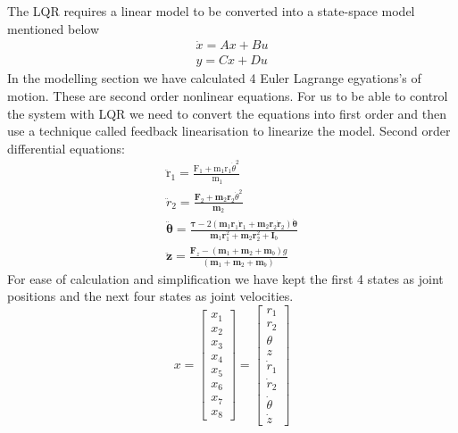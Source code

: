 \documentclass{UoNMCHA}
\numberwithin{equation}{section}
\begin{document}
The LQR requires a linear model to be converted into a state-space model mentioned below
$$
\begin{array}{l}
\dot{x}=A x+B u \\
y=C x+D u
\end{array}
$$
In the modelling section we have calculated 4 Euler Lagrange egyations's of motion. These are second
order nonlinear equations. For us to be able to control the system with LQR we need to convert the
equations into first order and then use a technique called feedback linearisation to linearize the model.
Second order differential equations:
$$
\begin{array}{c}
\ddot{\mathrm{r}}_{1}=\frac{\mathrm{F}_{1}+\mathrm{m}_{1} \mathrm{r}_{1} \dot{\theta}^{2}}{\mathrm{~m}_{1}} \\
\ddot{r}_{2}=\frac{\boldsymbol{F}_{2}+\boldsymbol{m}_{2} \boldsymbol{r}_{2} \dot{\theta}^{2}}{\boldsymbol{m}_{2}} \\
\ddot{\boldsymbol{\theta}}=\frac{\boldsymbol{\tau}-2\left(\boldsymbol{m}_{1} \boldsymbol{r}_{1} \dot{\boldsymbol{r}}_{1}+\boldsymbol{m}_{2} \boldsymbol{r}_{2} \dot{\boldsymbol{r}}_{2}\right) \dot{\boldsymbol{\theta}}}{\boldsymbol{m}_{1} \boldsymbol{r}_{1}^{2}+\boldsymbol{m}_{2} \boldsymbol{r}_{2}^{2}+\boldsymbol{I}_{b}} \\
\ddot{\mathbf{z}}=\frac{\boldsymbol{F}_{z}-\left(\boldsymbol{m}_{1}+\boldsymbol{m}_{2}+\boldsymbol{m}_{b}\right) g}{\left(\boldsymbol{m}_{1}+\boldsymbol{m}_{2}+\boldsymbol{m}_{b}\right)}
\end{array}
$$
For ease of calculation and simplification we have kept the first 4 states as joint positions and the next
four states as joint velocities.
$$
x=\left[\begin{array}{l}
x_{1} \\
x_{2} \\
x_{3} \\
x_{4} \\
x_{5} \\
x_{6} \\
x_{7} \\
x_{8}
\end{array}\right]=\left[\begin{array}{c}
r_{1} \\
r_{2} \\
\theta \\
z \\
\dot{r}_{1} \\
\dot{r}_{2} \\
\dot{\theta} \\
\dot{z}
\end{array}\right]
$$
\end{document}
